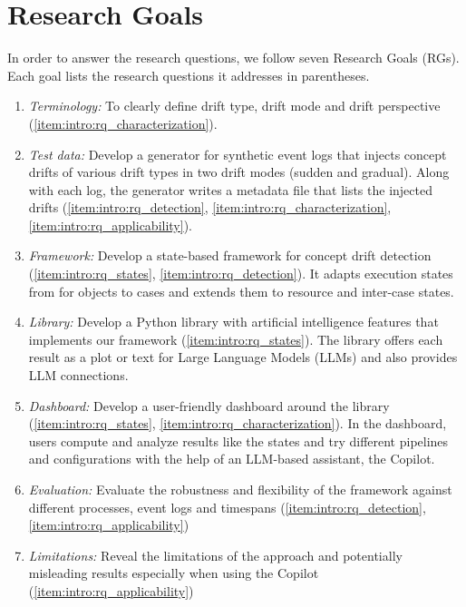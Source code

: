 \section{Research Goals}
\label{sec:intro_ssec:goals}
In order to answer the research questions, we follow seven Research Goals (RGs). Each goal lists the research questions it addresses in parentheses.
\begin{enumerate}[label=\textbf{RG\arabic*}, ref=RG\arabic*, leftmargin=*]
	\item\label{item:intro:rg_terminology} \emph{Terminology:} To clearly define drift type, drift mode and drift perspective (\ref{item:intro:rq_characterization}).
	\item\label{item:intro:rg_rheon} \emph{Test data:} Develop a generator for synthetic event logs that injects concept drifts of various drift types in two drift modes (sudden and gradual). Along with each log, the generator writes a metadata file that lists the injected drifts (\ref{item:intro:rq_detection}, \ref{item:intro:rq_characterization}, \ref{item:intro:rq_applicability}).
	\item\label{item:intro:rg_framework} \emph{Framework:} Develop a state-based framework for concept drift detection (\ref{item:intro:rq_states}, \ref{item:intro:rq_detection}). It adapts execution states from \textcite{berti2025ocel} for objects to cases and extends them to resource and inter-case states.
	\item\label{item:intro:rg_library} \emph{Library:} Develop a Python library with artificial intelligence features that implements our framework (\ref{item:intro:rq_states}). The library offers each result as a plot or text for Large Language Models (LLMs) and also provides LLM connections.
	\item\label{item:intro:rg_dashboard} \emph{Dashboard:} Develop a user-friendly dashboard around the library (\ref{item:intro:rq_states}, \ref{item:intro:rq_characterization}). In the dashboard, users compute and analyze results like the states and try different pipelines and configurations with the help of an LLM-based assistant, the Copilot.
	\item \label{item:intro:rg_evaluation} \emph{Evaluation:} Evaluate the robustness and flexibility of the framework against different processes, event logs and timespans (\ref{item:intro:rq_detection}, \ref{item:intro:rq_applicability})
	\item \label{item:intro:rg_limitations} \emph{Limitations:} Reveal the limitations of the approach and potentially misleading results especially when using the Copilot (\ref{item:intro:rq_applicability})
\end{enumerate}


